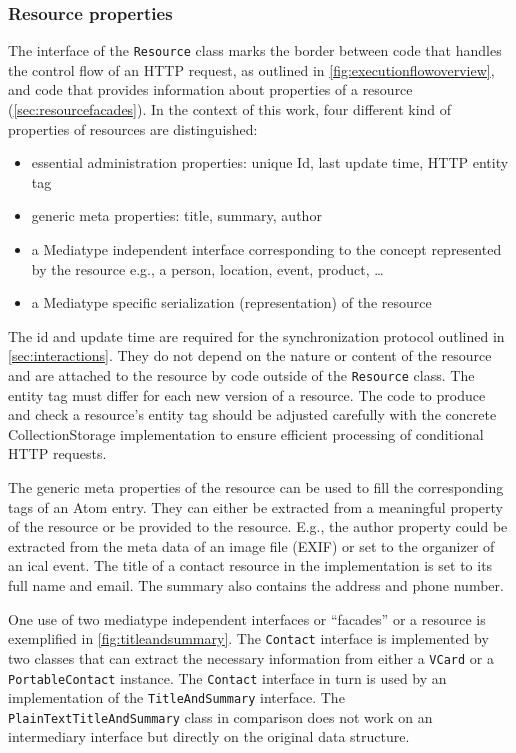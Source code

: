 \documentclass[11pt,a4paper,headsepline,twoside]{scrartcl}		%
\begin{document}
\subsubsection{Resource properties}
\label{sec:resource-properties}

The interface of the \lstinline:Resource: class marks the border between code
that handles the control flow of an HTTP request, as outlined in
\autoref{fig:executionflowoverview}, and code that provides information about
properties of a resource (\autoref{sec:resourcefacades}). In the context of this
work, four different kind of properties of resources are distinguished:

\begin{itemize}
\item essential administration properties: unique Id, last update time, HTTP
  entity tag
\item generic meta properties: title, summary, author
\item a Mediatype independent interface corresponding to the concept represented
  by the resource e.g., a person, location, event, product, \ldots
\item a Mediatype specific serialization (representation) of the resource
\end{itemize}

The id and update time are required for the synchronization protocol outlined in
\autoref{sec:interactions}. They do not depend on the nature or content of the
resource and are attached to the resource by code outside of the
\lstinline:Resource: class. The entity tag must differ for each new version of a
resource. The code to produce and check a resource's entity tag should be
adjusted carefully with the concrete CollectionStorage implementation to ensure
efficient processing of conditional HTTP requests.

The generic meta properties of the resource can be used to fill the
corresponding tags of an Atom entry. They can either be extracted from a
meaningful property of the resource or be provided to the resource. E.g., the
author property could be extracted from the meta data of an image file (EXIF) or
set to the organizer of an ical event. The title of a contact resource in the
implementation is set to its full name and email. The summary also contains the
address and phone number.

One use of two mediatype independent interfaces or ``facades'' or a resource is
exemplified in \autoref{fig:titleandsummary}. The \lstinline:Contact: interface
is implemented by two classes that can extract the necessary information from
either a \lstinline:VCard: or a \lstinline:PortableContact: instance. The
\lstinline:Contact: interface in turn is used by an implementation of the
\lstinline:TitleAndSummary: interface. The \lstinline:PlainTextTitleAndSummary:
class in comparison does not work on an intermediary interface but directly on
the original data structure.
\end{document}
